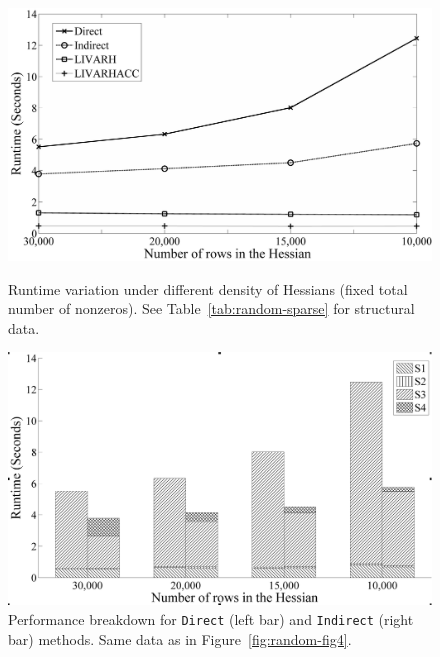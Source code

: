 \documentclass[11pt, twocolumn]{article}
\begin{document}
{\begin{figure}[htbp]
\centering
\begin{minipage}[b]{0.48\linewidth}
\includegraphics[width=1\textwidth]{figures/HRfig4BW}
\caption[Runtime Variation Under Different Density of Hessians]
{Runtime variation under different density of Hessians (fixed total number of nonzeros). See Table~\ref{tab:random-sparse} for structural data.}
\label{fig:random-fig4}
\end{minipage}
\quad
\begin{minipage}[b]{0.48\linewidth}
\includegraphics[width=1\textwidth]{figures/HRfig5BW}
\caption[Performance Breakdown for {\tt Direct} and {\tt Indirect} under 
Varying Density of Hessians]
{Performance breakdown for {\tt Direct} (left bar) and {\tt Indirect} (right bar) methods. Same data as in Figure~\ref{fig:random-fig4}.}
\label{fig:random-fig5}
\end{minipage}
\end{figure}

}
\end{document}

